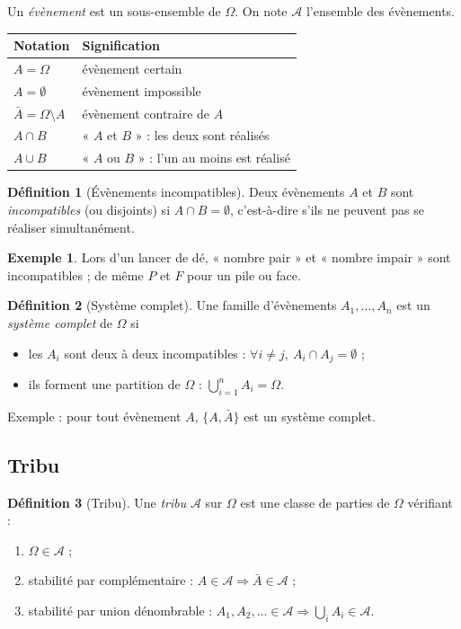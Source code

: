 \documentclass[11pt,a4paper]{article}
\newcommand{\A}{\mathcal{A}}
\newcommand{\1}{\mathbf{1}}
\theoremstyle{definition}
\newtheorem*{definition}{Définition}
\newtheorem*{exemple}{Exemple}
\theoremstyle{plain}
\theoremstyle{remark}
\begin{document}
Un \emph{évènement} est un sous-ensemble de $\Omega$. On note $\A$ l'ensemble des évènements.

\begin{center}
\begin{tabular}{ll}
\toprule
\textbf{Notation} & \textbf{Signification}\\
\midrule
$A=\Omega$ & évènement certain\\
$A=\emptyset$ & évènement impossible\\
$\bar A=\Omega\setminus A$ & évènement contraire de $A$\\
$A\cap B$ & « $A$ et $B$ » : les deux sont réalisés\\
$A\cup B$ & « $A$ ou $B$ » : l'un au moins est réalisé\\
\bottomrule
\end{tabular}
\end{center}

\begin{definition}[Évènements incompatibles]
Deux évènements $A$ et $B$ sont \emph{incompatibles} (ou disjoints) si $A\cap B=\emptyset$, c'est-à-dire s'ils ne peuvent pas se réaliser simultanément.
\end{definition}

\begin{exemple}
Lors d'un lancer de dé, « nombre pair » et « nombre impair » sont incompatibles ; de même $P$ et $F$ pour un pile ou face.
\end{exemple}

\begin{definition}[Système complet]
Une famille d'évènements $A_1,\dots,A_n$ est un \emph{système complet} de $\Omega$ si
\begin{itemize}
  \item les $A_i$ sont deux à deux incompatibles : $\forall i\neq j,\ A_i\cap A_j=\emptyset$ ;
  \item ils forment une partition de $\Omega$ : $\bigcup_{i=1}^{n}A_i=\Omega$.
\end{itemize}
Exemple : pour tout évènement $A$, $\{A,\bar A\}$ est un système complet.
\end{definition}

\subsection{Tribu}

\begin{definition}[Tribu]
Une \emph{tribu} $\A$ sur $\Omega$ est une classe de parties de $\Omega$ vérifiant :
\begin{enumerate}
  \item $\Omega\in\A$ ;
  \item stabilité par complémentaire : $A\in\A\Rightarrow\bar A\in\A$ ;
  \item stabilité par union dénombrable : $A_1,A_2,\dots\in\A\Rightarrow\bigcup_i A_i\in\A$.
\end{enumerate}
\end{definition}
\end{document}
